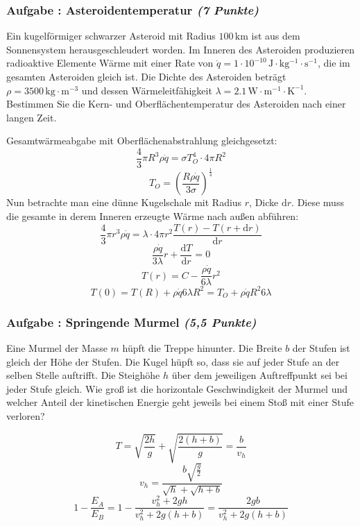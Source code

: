 \documentclass[12pt,a4paper]{article}
\newcommand{\ee}[1]{\cdot 10^{#1}}
\newcommand{\unit}[1]{\,\mathrm{#1}}
\newcommand{\dif}{\mathrm{d}}
\newcommand{\tdif}[2]{\frac{\dif#1}{\dif#2}}
\newcounter{numlabel}
\newenvironment{problem}[2]{\stepcounter{numlabel} \vspace{1ex} \subsubsection*{Aufgabe \the\value{numlabel}: #1 \emph{(#2 Punkte)}} \renewcommand{\Currentlabel}{Aufgabe \the\value{numlabel}: #1}}{

}
\begin{document}
\begin{problem}{Asteroidentemperatur}{7}
Ein kugelförmiger schwarzer Asteroid mit Radius $100 \unit{km}$ ist aus dem Sonnensystem herausgeschleudert worden. Im Inneren des Asteroiden produzieren radioaktive Elemente Wärme mit einer Rate von $\dot{q}=1 \ee{-10} \unit{J\cdot kg^{-1} \cdot s^{-1}}$, die im gesamten Asteroiden gleich ist. Die Dichte des Asteroiden beträgt $\rho=3500 \unit{kg \cdot m^{-3}}$ und dessen Wärmeleitfähigkeit $\lambda=2.1 \unit{W \cdot m^{-1} \cdot K^{-1}}$. Bestimmen Sie die Kern- und Oberflächentemperatur des Asteroiden nach einer langen Zeit.
\begin{solution}
Gesamtwärmeabgabe mit Oberflächenabstrahlung gleichgesetzt:
\[
\frac43 \pi R^3 \rho \dot{q}=\sigma T_O^4 \cdot 4\pi R^2
\]
\[
T_O=\left( \frac{R\rho \dot{q}}{3\sigma} \right)^\frac14
\]
Nun betrachte man eine dünne Kugelschale mit Radius $r$, Dicke $\dif r$. Diese muss die gesamte in derem Inneren erzeugte Wärme nach außen abführen:
\[
\frac43 \pi r^3 \rho \dot{q}=\lambda \cdot 4\pi r^2 \frac{T(r)-T(r+\dif r)}{\dif r}
\]
\[
\frac{\rho \dot{q}}{3 \lambda}r+\tdif{T}{r}=0
\]
\[
T(r)=C-\frac{\rho \dot{q}}{6 \lambda} r^2
\]
\[
T(0)=T(R)+{\rho \dot{q}}{6 \lambda}R^2=T_O+{\rho \dot{q} R^2}{6 \lambda}
\]
\end{solution}
\end{problem}

\begin{problem}{Springende Murmel}{5,5}
Eine Murmel der Masse $m$ hüpft die Treppe hinunter. Die Breite $b$ der Stufen ist gleich der Höhe der Stufen. Die Kugel hüpft so, dass sie auf jeder Stufe an der selben Stelle auftrifft. Die Steighöhe $h$ über dem jeweiligen Auftreffpunkt sei bei jeder Stufe gleich. Wie groß ist die horizontale Geschwindigkeit der Murmel und welcher Anteil der kinetischen Energie geht jeweils bei einem Stoß mit einer Stufe verloren?
\begin{solution}
\[
T=\sqrt{\frac{2h}{g}}+\sqrt{\frac{2(h+b)}{g}}=\frac{b}{v_h}
\]
\[
v_h=\frac{b\sqrt{\frac{g}{2}}}{\sqrt{h}+\sqrt{h+b}}
\]
\[
1-\frac{E_A}{E_B}=1-\frac{v_h^2+2gh}{v_h^2+2g(h+b)}=\frac{2gb}{v_h^2+2g(h+b)}
\]
\end{solution}
\end{problem}
\end{document}
